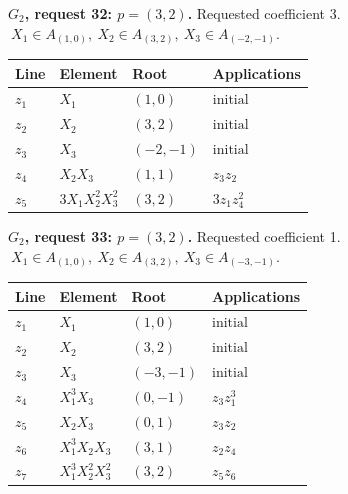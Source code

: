 \par\medskip\noindent\begin{minipage}{\textwidth}
\textbf{\(G_2\), request 32: \(p=(3,2)\).} Requested coefficient 3.
\(\ X_1\in A_{(1,0)},\ X_2\in A_{(3,2)},\ X_3\in A_{(-2,-1)}.\)\par
\smallskip\centering\small\begin{tabular}{@{}llll@{}}\toprule
Line & Element & Root & Applications\\\midrule
\(z_{1}\) & \(X_1\) & \((1,0)\) & \(\text{initial}\) \\
\(z_{2}\) & \(X_2\) & \((3,2)\) & \(\text{initial}\) \\
\(z_{3}\) & \(X_3\) & \((-2,-1)\) & \(\text{initial}\) \\
\(z_{4}\) & \(X_2X_3\) & \((1,1)\) & \(z_{3}z_{2}\) \\
\(z_{5}\) & \(3X_1X_2^{2}X_3^{2}\) & \((3,2)\) & \(3z_{1}z_{4}^{2}\) \\
\bottomrule\end{tabular}\end{minipage}\par
\par\medskip\noindent\begin{minipage}{\textwidth}
\textbf{\(G_2\), request 33: \(p=(3,2)\).} Requested coefficient 1.
\(\ X_1\in A_{(1,0)},\ X_2\in A_{(3,2)},\ X_3\in A_{(-3,-1)}.\)\par
\smallskip\centering\small\begin{tabular}{@{}llll@{}}\toprule
Line & Element & Root & Applications\\\midrule
\(z_{1}\) & \(X_1\) & \((1,0)\) & \(\text{initial}\) \\
\(z_{2}\) & \(X_2\) & \((3,2)\) & \(\text{initial}\) \\
\(z_{3}\) & \(X_3\) & \((-3,-1)\) & \(\text{initial}\) \\
\(z_{4}\) & \(X_1^{3}X_3\) & \((0,-1)\) & \(z_{3}z_{1}^{3}\) \\
\(z_{5}\) & \(X_2X_3\) & \((0,1)\) & \(z_{3}z_{2}\) \\
\(z_{6}\) & \(X_1^{3}X_2X_3\) & \((3,1)\) & \(z_{2}z_{4}\) \\
\(z_{7}\) & \(X_1^{3}X_2^{2}X_3^{2}\) & \((3,2)\) & \(z_{5}z_{6}\) \\
\bottomrule\end{tabular}\end{minipage}\par
